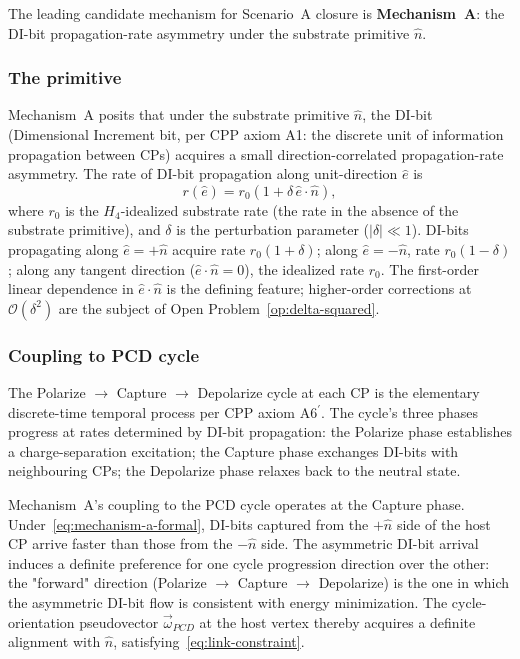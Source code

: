 \documentclass[11pt,letterpaper]{article}
\newcommand{\omegaPCD}{\vec{\omega}_{PCD}}
\newcommand{\bigO}[1]{\mathcal{O}(#1)}
\begin{document}
The leading candidate mechanism for Scenario~A closure is \textbf{Mechanism~A}: the DI-bit propagation-rate asymmetry under the substrate primitive $\hat{n}$.

\subsubsection*{The primitive}

Mechanism~A posits that under the substrate primitive $\hat{n}$, the DI-bit (Dimensional Increment bit, per CPP axiom A1: the discrete unit of information propagation between CPs) acquires a small direction-correlated propagation-rate asymmetry. The rate of DI-bit propagation along unit-direction $\hat{e}$ is
\begin{equation}
r(\hat{e}) = r_0 \left(1 + \delta \, \hat{e} \cdot \hat{n}\right),
\label{eq:mechanism-a-formal}
\end{equation}
where $r_0$ is the $H_4$-idealized substrate rate (the rate in the absence of the substrate primitive), and $\delta$ is the perturbation parameter ($|\delta| \ll 1$). DI-bits propagating along $\hat{e} = +\hat{n}$ acquire rate $r_0(1 + \delta)$; along $\hat{e} = -\hat{n}$, rate $r_0(1 - \delta)$; along any tangent direction ($\hat{e} \cdot \hat{n} = 0$), the idealized rate $r_0$. The first-order linear dependence in $\hat{e} \cdot \hat{n}$ is the defining feature; higher-order corrections at $\bigO{\delta^2}$ are the subject of Open Problem~\ref{op:delta-squared}.

\subsubsection*{Coupling to PCD cycle}

The Polarize $\to$ Capture $\to$ Depolarize cycle at each CP is the elementary discrete-time temporal process per CPP axiom A6$^{\prime}$. The cycle's three phases progress at rates determined by DI-bit propagation: the Polarize phase establishes a charge-separation excitation; the Capture phase exchanges DI-bits with neighbouring CPs; the Depolarize phase relaxes back to the neutral state.

Mechanism~A's coupling to the PCD cycle operates at the Capture phase. Under~\eqref{eq:mechanism-a-formal}, DI-bits captured from the $+\hat{n}$ side of the host CP arrive faster than those from the $-\hat{n}$ side. The asymmetric DI-bit arrival induces a definite preference for one cycle progression direction over the other: the "forward" direction (Polarize $\to$ Capture $\to$ Depolarize) is the one in which the asymmetric DI-bit flow is consistent with energy minimization. The cycle-orientation pseudovector $\omegaPCD$ at the host vertex thereby acquires a definite alignment with $\hat{n}$, satisfying~\eqref{eq:link-constraint}.
\end{document}
